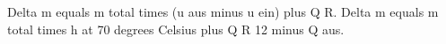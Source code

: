 Delta m equals m total times (u aus minus u ein) plus Q R.  
Delta m equals m total times h at 70 degrees Celsius plus Q R 12 minus Q aus.